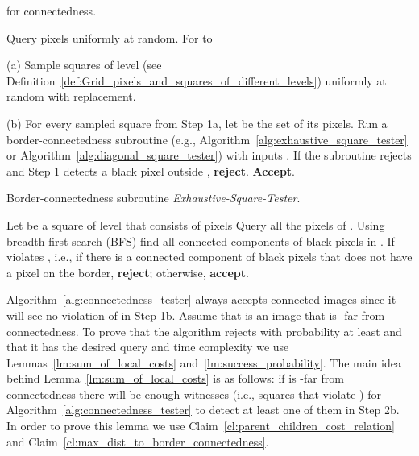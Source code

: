 \documentclass[11pt,english]{article}
\numberwithin{figure}{section}
\newcommand{\Accept}{\textbf{Accept}\xspace}
\newcommand{\accept}{\textbf{accept}\xspace}
\newcommand{\reject}{\textbf{reject}\xspace}
\begin{document}
\begin{algorithm}\label{alg:connectedness_tester}
\caption{ for connectedness.}
\DontPrintSemicolon
\BlankLine
\nl
Query  pixels uniformly at random.
\;
\nl For  to  

 (a) Sample  squares of level   (see Definition~\ref{def:Grid_pixels_and_squares_of_different_levels})
    uniformly at random with replacement.

 (b) For every sampled square  from Step 1a, let
      be the set of its pixels.
Run a border-connectedness subroutine (e.g.,
Algorithm~\ref{alg:exhaustive_square_tester} or
Algorithm~\ref{alg:diagonal_square_tester}) with inputs . If the
subroutine rejects and Step 1 detects a black pixel outside , \reject.
\;
\nl
\Accept.
\;
\end{algorithm}
\begin{algorithm}\label{alg:exhaustive_square_tester}
\caption{Border-connectedness subroutine \emph{Exhaustive-Square-Tester}.}
\DontPrintSemicolon
\BlankLine
Let  be a square of level  that consists of pixels 
\;
\nl
 Query all the pixels of .
 \;
\nl
Using breadth-first search (BFS) find all connected components of black pixels
in .
 \;
\nl
 If  violates , i.e., if there is a connected component of black
 pixels that does not have a pixel on the border, \reject; otherwise,
 \accept.
 \;
\end{algorithm}
Algorithm~\ref{alg:connectedness_tester} always accepts connected images
since it will see no violation of  in Step 1b. Assume that  is an image that is -far from connectedness. To prove that the
algorithm rejects  with probability at least  and that it has the
desired query and time complexity we use
Lemmas~\ref{lm:sum_of_local_costs} and~\ref{lm:success_probability}. The
main idea behind Lemma~\ref{lm:sum_of_local_costs} is as follows: if  is
-far from connectedness there will be enough witnesses (i.e., squares
that violate ) for Algorithm~\ref{alg:connectedness_tester} to
detect at least one of them in Step 2b. In order to prove this lemma we use Claim~\ref{cl:parent_children_cost_relation} and
Claim~\ref{cl:max_dist_to_border_connectedness}.
\end{document}
